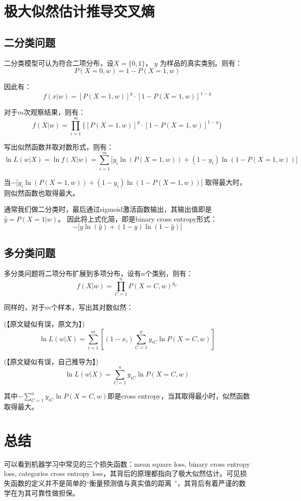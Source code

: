 \documentclass[12pt]{article}
\begin{document}
\section{极大似然估计推导交叉熵}
\subsection{二分类问题}
二分类模型可认为符合二项分布，设$X=\{0,1\}$， $y$ 为样品的真实类别。则有：
$$
P(X=0,w) = 1 - P(X=1,w)
$$

因此有：
$$
f(x|w) = [P(X=1,w)]^y\cdot[1 - P(X=1,w)]^{1-y}
$$

对于$m$次观察结果，则有：
$$
f(X|w) = \prod_{i=1}^m\{[P(X=1,w)]^y\cdot[1 - P(X=1,w)]^{1-y}\}
$$

写出似然函数并取对数形式，则有：
$$
\ln{L(w|X)} = \ln{f(X|w)} = \sum_{i=1}^m\big[y_i\ln(P(X=1,w)) +  (1-y_i)\ln(1-P(X=1,w))\big]
$$

当$ -\big[y_i\ln(P(X=1,w)) + (1-y_i)\ln(1-P(X=1,w))\big]$ 取得最大时，则似然函数也取得最大。

通常我们做二分类时，最后通过sigmoid激活函数输出，其输出值即是$\hat{y} = P(X=1|w)$。
因此将上式化简，即是binary cross entropy形式：
$$
-\big[y\ln(\hat{y}) + (1-y)\ln(1-\hat{y})\big]
$$

\subsection{多分类问题}
多分类问题将二项分布扩展到多项分布，设有$n$个类别，则有：
$$
f(X|w) = \prod_{C=1}^nP(X=C,w)^{y_C}
$$

同样的，对于$m$个样本，写出其对数似然：

(【原文疑似有误，原文为】)
$$
\ln{L(w|X)} = \sum_{i=1}^m[(1-x_i)\sum_{C=1}^n y_{iC}\ln{P(X=C,w)}]
$$

(【原文疑似有误，自己推导为】)
$$
\ln{L(w|X)} = \sum_{C=1}^n y_{iC}\ln{P(X=C,w)}
$$

其中$- \sum_{C=1}^n y_{iC}\ln{P(X=C,w)}$即是cross entropy，当其取得最小时，似然函数取得最大。

\section{总结}
可以看到机器学习中常见的三个损失函数：mean square loss, binary cross entropy loss, categories cross entropy loss，其背后的原理都指向了极大似然估计。可见损失函数的定义并不是简单的“衡量预测值与真实值的距离
”，其背后有着严谨的数学在为其可靠性做担保。



\end{document}
